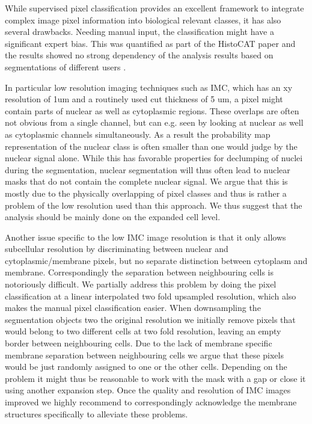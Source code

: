 \documentclass[a4paper]{article}
\begin{document}
While supervised pixel classification provides an excellent framework to integrate complex image
pixel information into biological relevant classes, it has also several drawbacks. Needing manual
input, the classification  might have a significant expert bias. This was quantified as part of the
HistoCAT paper and the results showed no strong dependency of the analysis results based on
segmentations of different users \cite{schapiro_histocat:_2017}.

In particular low resolution imaging techniques such as IMC, which has an xy resolution of 1um and
a routinely used cut thickness of 5 um, a pixel might contain parts of nuclear as well as
cytoplasmic regions. These overlaps are often not obvious from a single channel, but can e.g. seen
by looking at nuclear as well as cytoplasmic channels simultaneously. As a result the probability
map representation of the nuclear class is often smaller than one would judge by the nuclear signal
alone. While this has favorable properties for declumping of nuclei during the segmentation, nuclear
segmentation will thus often lead to nuclear masks that do not contain
the complete nuclear signal. We argue that this is mostly due to the physically overlapping of
pixel classes and thus is rather a problem of the low resolution used than this approach. We thus
suggest that the analysis should be mainly done on the expanded cell level.

Another issue specific to the low IMC image resolution is that it only allows subcellular
resolution by discriminating
between nuclear and cytoplasmic/membrane pixels, but no separate distinction between cytoplasm and
membrane. Correspondingly the separation between neighbouring cells is notoriously difficult. We
partially address this problem by doing the pixel classification at a linear interpolated two fold
upsampled resolution, which also makes the manual pixel classification easier. When downsampling the
segmentation objects two the original resolution we initially remove pixels that would belong to two different cells at
two fold resolution, leaving an empty border between neighbouring cells. Due to the lack of
membrane specific membrane separation between neighbouring cells we argue that these pixels would
be just randomly assigned to one or the other cells. Depending on the problem it might thus be
reasonable to work with the mask with a gap or close it using another expansion step. Once the quality and resolution of IMC
images improved we highly recommend to correspondingly acknowledge the membrane structures
specifically to alleviate these problems.
\end{document}
